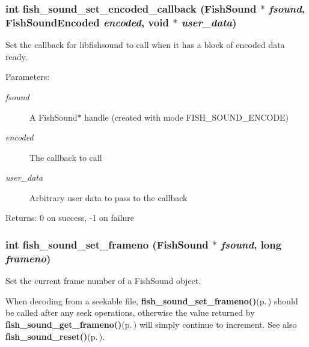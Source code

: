 \subsubsection{\setlength{\rightskip}{0pt plus 5cm}int fish\_\-sound\_\-set\_\-encoded\_\-callback ({\bf Fish\-Sound} $\ast$ {\em fsound}, {\bf Fish\-Sound\-Encoded} {\em encoded}, void $\ast$ {\em user\_\-data})}\label{fishsound_8h_a6}


Set the callback for libfishsound to call when it has a block of encoded data ready. 

\begin{Desc}
\item[Parameters:]
\begin{description}
\item[{\em fsound}]A Fish\-Sound$\ast$ handle (created with mode FISH\_\-SOUND\_\-ENCODE) \item[{\em encoded}]The callback to call \item[{\em user\_\-data}]Arbitrary user data to pass to the callback \end{description}
\end{Desc}
\begin{Desc}
\item[Returns:]0 on success, -1 on failure \end{Desc}
\subsubsection{\setlength{\rightskip}{0pt plus 5cm}int fish\_\-sound\_\-set\_\-frameno ({\bf Fish\-Sound} $\ast$ {\em fsound}, long {\em frameno})}\label{fishsound_8h_a16}


Set the current frame number of a Fish\-Sound object. 

When decoding from a seekable file, {\bf fish\_\-sound\_\-set\_\-frameno()}{\rm (p.\,\pageref{fishsound_8h_a16})} should be called after any seek operations, otherwise the value returned by {\bf fish\_\-sound\_\-get\_\-frameno()}{\rm (p.\,\pageref{fishsound_8h_a15})} will simply continue to increment. See also {\bf fish\_\-sound\_\-reset()}{\rm (p.\,\pageref{fishsound_8h_a10})}.

